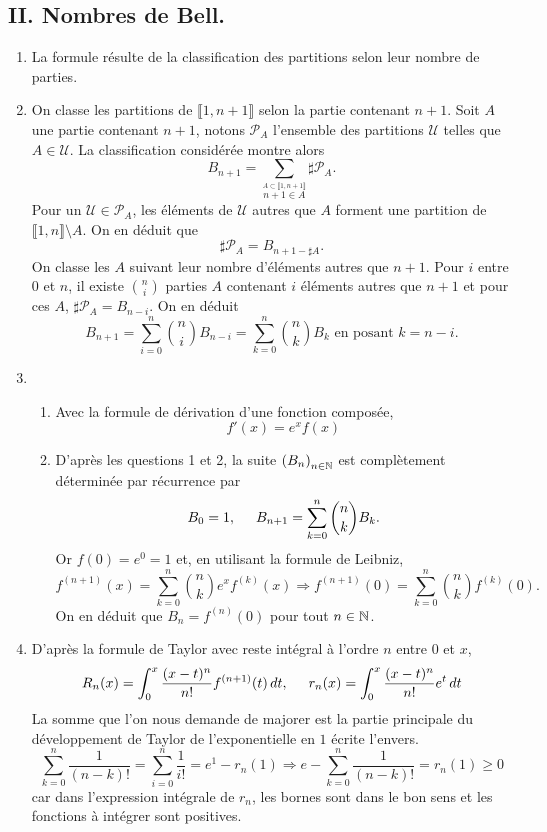 \subsection*{II. Nombres de Bell.}
 \begin{enumerate}
  \item La formule résulte de la classification des partitions selon leur nombre de parties.
  \item On classe les partitions de $\llbracket 1 , n+1\rrbracket$ selon la partie contenant $n+1$.\newline
Soit $A$ une partie contenant $n+1$, notons $\mathcal{P}_A$ l'ensemble des partitions $\mathcal{U}$ telles que $A\in \mathcal{U}$. La classification considérée montre alors
\[
 B_{n+1} = \sum_{\stackrel{A \subset \llbracket 1,n+1 \rrbracket}{ n+1 \in A}} \sharp \mathcal{P}_A.
\]
Pour un $\mathcal{U}\in \mathcal{P}_A$, les éléments de $\mathcal{U}$ autres que $A$ forment une partition de $\llbracket 1, n \rrbracket \setminus A$. On en déduit que
\[
 \sharp \mathcal{P}_A = B_{n+1 - \sharp A}.
\]
On classe les $A$ suivant leur nombre d'éléments autres que $n+1$. Pour $i$ entre $0$ et $n$, il existe $\binom{n}{i}$ parties $A$ contenant $i$ éléments autres que $n+1$ et pour ces $A$, $\sharp \mathcal{P}_A = B_{n - i}$. On en déduit
\[
 B_{n+1} = \sum_{i=0}^n \binom{n}{i}B_{n - i} = \sum_{k=0}^n \binom{n}{k}B_{k} \text{ en posant } k = n-i.
\]

 \item
 \begin{enumerate}
  \item Avec la formule de dérivation d'une fonction composée,
\[
 f'(x) = e^x f(x)
\]

  \item D'après les questions 1 et 2, la suite $\left( B_n \right)_{n \in \mathbb{N}}$ est complètement déterminée par récurrence par 
\[
 B_0 = 1 , \hspace{0.5cm} B_{n+1} = \sum_{k=0}^n \binom{n}{k}B_k.
\]
Or $f(0)=e^0 = 1$ et, en utilisant la formule de Leibniz,
\[
 f^{(n+1)}(x) = \sum_{k=0}^n \binom{n}{k}e^xf^{(k)}(x)
 \Rightarrow f^{(n+1)}(0) = \sum_{k=0}^n \binom{n}{k}f^{(k)}(0).
\]
On en déduit que $B_n = f^{(n)}(0)$ pour tout $n\in \mathbb{N}$.
 \end{enumerate}

 \item D'après la formule de Taylor avec reste intégral à l'ordre $n$ entre $0$ et $x$,
\[
 R_n(x) = \int_0^x\frac{(x-t)^n}{n!}f^{(n + 1)}(t) \,dt, \hspace{0.5cm} r_n(x) = \int_0^x\frac{(x-t)^n}{n!}e^t \,dt
\]
La somme que l'on nous demande de majorer est la partie principale du développement de Taylor de l'exponentielle en $1$ écrite  l'envers\fg.
\[
 \sum_{k=0}^n\frac{1}{(n-k)!} = \sum_{i=0}^n \frac{1}{i!} = e^1 - r_n(1) \Rightarrow 
 e - \sum_{k=0}^n\frac{1}{(n-k)!} = r_n(1)\geq 0
\]
car dans l'expression intégrale de $r_n$, les bornes sont dans le bon sens et les fonctions à intégrer sont positives. 
 

\end{enumerate}
